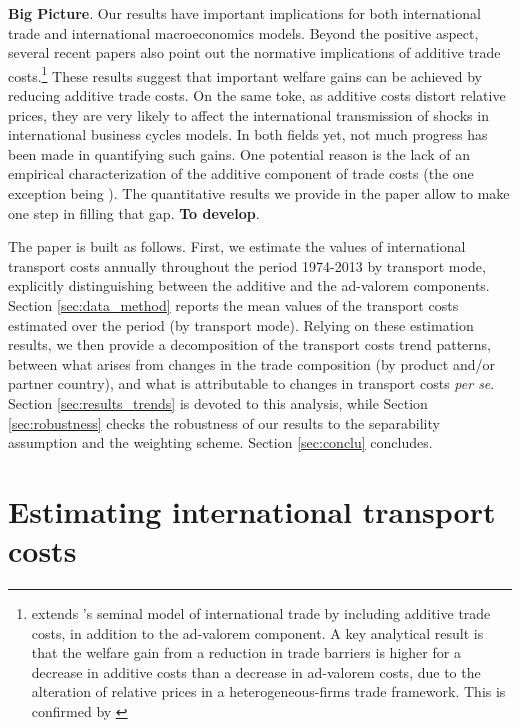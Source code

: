 \documentclass[a4paper,11pt]{article}
\begin{document}
\textbf{Big Picture}.
Our results have important implications for both international trade and international macroeconomics models. Beyond the positive aspect, several recent papers also point out the normative implications of additive trade costs.\footnote{ \cite{sorensen2014} extends \cite{melitz}'s seminal model of international trade by including additive trade costs, in addition to the ad-valorem component. A key analytical result is that the welfare gain from a reduction in trade barriers is higher for a decrease in additive costs than a decrease in ad-valorem costs, due to the alteration of relative prices in a heterogeneous-firms trade framework. This is confirmed by \cite{Irrazabal_2015}} These results suggest that important welfare gains can be achieved by reducing additive trade costs. On the same toke, as additive costs distort relative prices, they are very likely to affect the international transmission of shocks in international business cycles models. In both fields yet, not much progress has been made in quantifying such gains. One potential reason is the lack of an empirical characterization of the additive component of trade costs (the one exception being \citealp{Irrazabal_2015}). The quantitative results we provide in the paper allow to make one step in filling that gap. \textbf{To develop}. \medskip


The paper is built as follows.
First, we estimate the values of international transport costs annually throughout the period 1974-2013 by transport mode, explicitly distinguishing between the additive and the ad-valorem components.
 Section \ref{sec:data_method} reports the mean values of the transport costs estimated over the period (by transport mode).
Relying on these estimation results, we then provide a decomposition of the transport costs trend patterns, between what arises from changes in the trade composition (by product and/or partner country), and what is attributable to changes in transport costs \textit{per se}.
Section \ref{sec:results_trends} is devoted to this analysis, while Section \ref{sec:robustness} checks the robustness of our results to the separability assumption and the weighting scheme.
Section \ref{sec:conclu} concludes.



\section{Estimating international transport costs\label{sec:data_method}}
\end{document}
